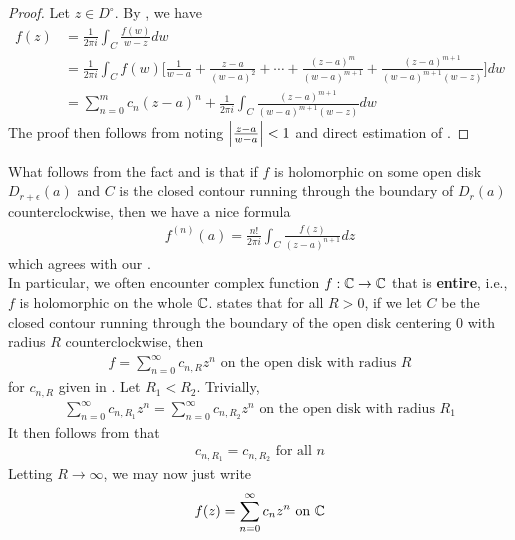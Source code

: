 \documentclass{report}
\begin{document}
\begin{proof}
Let $z\in D^{\circ }$. By , we have 
\begin{align*}
f(z)&= \frac{1}{2\pi  i}\int_C \frac{f(w)}{w-z}dw \\
&=\frac{1}{2\pi  i}\int_C f(w)\Big[ \frac{1}{w-a} + \frac{z-a}{(w-a)^2}+ \cdots + \frac{(z-a)^m}{(w-a)^{m+1}} + \frac{(z-a)^{m+1}}{(w-a)^{m+1}(w-z)} \Big]dw \\
&=\sum_{n=0}^{m} c_n (z-a)^n + \frac{1}{2\pi  i}\int_C \frac{(z-a)^{m+1}}{(w-a)^{m+1}(w-z)}dw
\end{align*}
The proof then follows from noting  $\left|\frac{z-a}{w-a}\right|<1$ and direct estimation of . 
\end{proof}
\begin{mdframed}
What follows from the fact   and 
 is that if $f$ is holomorphic on some open disk  $D_{r+\epsilon }(a)$ and $C$ is the closed contour running through the boundary of  $D_r(a)$ counterclockwise, then we have a nice formula  
\begin{align*}
f^{(n)}(a)=  \frac{n!}{2\pi  i}\int_C \frac{f(z)}{(z-a)^{n+1}}dz
\end{align*}
which agrees with our .\\ 

In particular, we often encounter  complex function $f:\mathbb{C}\rightarrow \mathbb{C}$ that is \textbf{entire}, i.e., $f$ is holomorphic on the whole $\mathbb{C}$.  states that for all $R>0$, if we let  $C$ be the closed contour running through the boundary of the open disk centering $0$ with radius  $R$  counterclockwise, then 
\begin{align*}
f=\sum_{n=0}^{\infty}c_{n,R} z^n \text{ on the open disk with radius }R
\end{align*}
for $c_{n,R}$ given in . Let $R_1< R_2$. Trivially, 
\begin{align*}
\sum_{n=0}^{\infty} c_{n,R_1}z^n=\sum_{n=0}^{\infty} c_{n,R_2}z^n\text{ on the open disk with radius }R_1
\end{align*}
It then follows from  that 
\begin{align*}
c_{n,R_1}=c_{n,R_2}\text{ for all }n
\end{align*}
Letting $R\to \infty$, we may now just write 
\begin{align*}
f(z)= \sum_{n=0}^{\infty}c_nz^n\text{ on }\mathbb{C}
\end{align*}
\end{mdframed}
\end{document}
